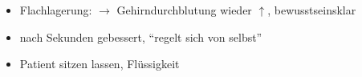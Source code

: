 
\begin{itemize}
  \item Flachlagerung: ${\rightarrow}$ Gehirndurchblutung
  wieder ${\uparrow}$, bewusstseinsklar
  \item nach Sekunden gebessert, \enquote{regelt sich von
  selbst}
  \item Patient sitzen lassen, Flüssigkeit
\end{itemize}